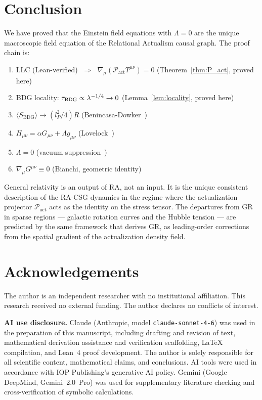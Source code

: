 \documentclass[11pt,a4paper]{article}
\newcommand{\Pact}{\mathcal{P}_{\mathrm{act}}}
\newcommand{\SBDG}{S_{\mathrm{BDG}}}
\begin{document}
\section{Conclusion}
\label{sec:conclusion}

We have proved that the Einstein field equations with $\Lambda = 0$
are the unique macroscopic field equation of the Relational Actualism
causal graph. The proof chain is:
\begin{enumerate}[noitemsep]
  \item LLC (Lean-verified) $\;\Rightarrow\;$
        $\nabla_\mu(\Pact T^{\mu\nu}) = 0$
        (Theorem~\ref{thm:P_act}, proved here)
  \item BDG locality: $\tau_{\rm BDG} \propto \lambda^{-1/4} \to 0$
        (Lemma~\ref{lem:locality}, proved here)
  \item $\langle\SBDG\rangle \to (l_P^2/4)R$
        (Benincasa-Dowker~\citep{Benincasa2010})
  \item $H_{\mu\nu} = \alpha G_{\mu\nu} + \Lambda g_{\mu\nu}$
        (Lovelock~\citep{Lovelock1971})
  \item $\Lambda = 0$ (vacuum suppression~\citep{Sandeman2026RAGC})
  \item $\nabla_\mu G^{\mu\nu} \equiv 0$ (Bianchi, geometric identity)
\end{enumerate}
General relativity is an output of RA, not an input. It is the unique
consistent description of the RA-CSG dynamics in the regime where the
actualization projector $\Pact$ acts as the identity on the stress
tensor. The departures from GR in sparse regions --- galactic rotation
curves and the Hubble tension --- are predicted by the same framework
that derives GR, as leading-order corrections from the spatial
gradient of the actualization density field.

\section*{Acknowledgements}

The author is an independent researcher with no institutional affiliation.
This research received no external funding.
The author declares no conflicts of interest.

\smallskip\noindent
\textbf{AI use disclosure.}
Claude (Anthropic, model \texttt{claude-sonnet-4-6}) was used in the
preparation of this manuscript, including drafting and revision of text,
mathematical derivation assistance and verification scaffolding,
\LaTeX{} compilation, and Lean~4 proof development.
The author is solely responsible for all scientific content,
mathematical claims, and conclusions.
AI tools were used in accordance with IOP Publishing's generative AI policy.
Gemini (Google DeepMind, Gemini~2.0~Pro) was used for supplementary
literature checking and cross-verification of symbolic calculations.
\end{document}
